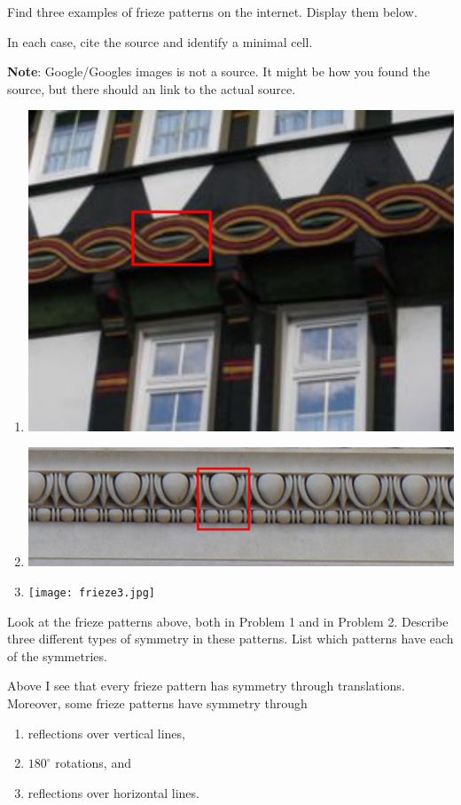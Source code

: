 \documentclass[noauthor,nooutcomes,hints,handout]{../ximera}
\begin{document}
\begin{question}
  Find three examples of frieze patterns on the internet.
  Display them below.

  In each case, cite the source and identify a minimal cell.
  
  \textbf{Note}: Google/Googles images is not a source. It might be how you found the source, but there should an link to the actual source.
  \begin{freeResponse}
    \begin{enumerate}
    \item \begin{center}
      \includegraphics[width=.6\textwidth]{frieze1.png}
    \end{center}
    \item
      \begin{center}
      \includegraphics[width=.6\textwidth]{frieze2.png}
      \end{center}
    \item
      \begin{center}
        \texttt{[image: frieze3.jpg]}
      \end{center}
    \end{enumerate}
  \end{freeResponse}
\end{question}
\mynewpage



\begin{question}
  Look at the frieze patterns above, both in Problem 1 and in Problem 2. Describe three different types of
  symmetry in these patterns. List which patterns have each of the symmetries.
  \begin{freeResponse}
    Above I see that every frieze pattern has symmetry through
    translations.  Moreover, some frieze patterns have symmetry
    through
    \begin{enumerate}
    \item reflections over vertical lines,
    \item $180^\circ$ rotations, and
    \item reflections over horizontal
      lines.
    \end{enumerate}
  \end{freeResponse}
\end{question}
\end{document}

